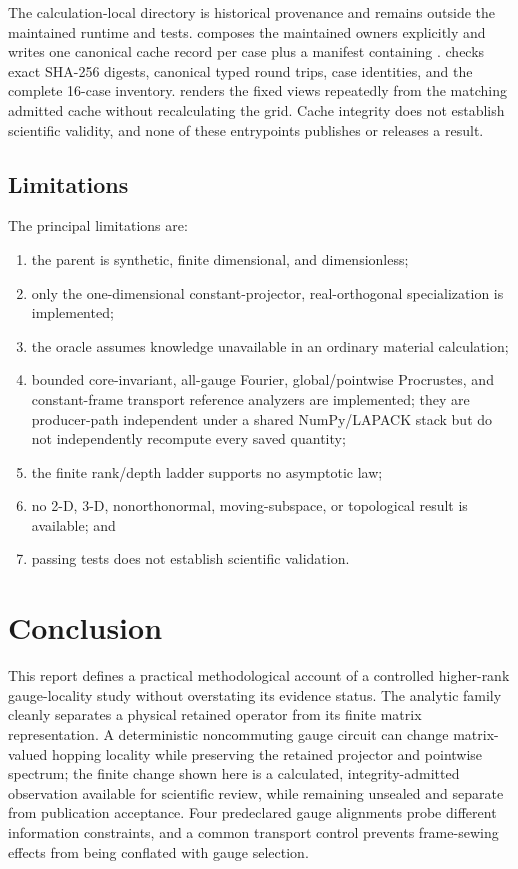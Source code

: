 \documentclass[11pt]{article}
\begin{document}
The calculation-local  directory is historical provenance and remains
outside the maintained runtime and tests.  composes the
maintained owners explicitly and writes one canonical cache record per case plus a
manifest containing .
 checks exact SHA-256 digests, canonical typed round trips,
case identities, and the complete 16-case inventory.  renders the
fixed views repeatedly from the matching admitted cache without recalculating the grid.
Cache integrity does not establish scientific validity, and none of these entrypoints
publishes or releases a result.

\subsection{Limitations}

The principal limitations are:
\begin{enumerate}
\item the parent is synthetic, finite dimensional, and dimensionless;
\item only the one-dimensional constant-projector, real-orthogonal specialization is implemented;
\item the oracle assumes knowledge unavailable in an ordinary material calculation;
\item bounded core-invariant, all-gauge Fourier, global/pointwise Procrustes, and
constant-frame transport reference analyzers are implemented; they are producer-path
independent under a shared NumPy/LAPACK stack but do not independently recompute every
saved quantity;
\item the finite rank/depth ladder supports no asymptotic law;
\item no 2-D, 3-D, nonorthonormal, moving-subspace, or topological result is available;
and
\item passing tests does not establish scientific validation.
\end{enumerate}

\section{Conclusion}
\label{sec:conclusion}

This report defines a practical methodological account of a controlled higher-rank
gauge-locality study without overstating its evidence status. The analytic
family cleanly separates a physical retained operator from its finite matrix
representation. A deterministic noncommuting gauge circuit can change matrix-valued
hopping locality while preserving the retained projector and pointwise spectrum; the
finite change shown here is a calculated, integrity-admitted observation available for
scientific review, while remaining unsealed and separate from publication acceptance.
Four predeclared gauge alignments probe different information constraints, and a
common transport control prevents frame-sewing effects from being conflated with gauge
selection.
\end{document}
